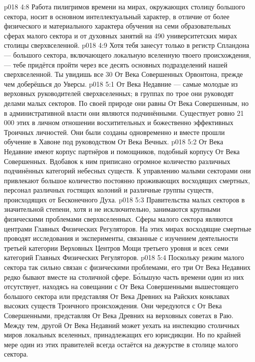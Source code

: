 \vs p018 4:8 Работа пилигримов времени на мирах, окружающих столицу большого сектора, носит в основном интеллектуальный характер, в отличие от более физического и материального характера обучения на семи образовательных сферах малого сектора и от духовных занятий на 490 университетских мирах столицы сверхвселенной.
\vs p018 4:9 Хотя тебя занесут только в регистр Спландона --- большого сектора, включающего локальную вселенную твоего происхождения, --- тебе придётся пройти через все десять основных подразделений нашей сверхвселенной. Ты увидишь все 30 От Века Совершенных Орвонтона, прежде чем доберёшься до Уверсы.
\vs p018 5:1 От Века Недавние --- самые молодые из верховных руководителей сверхвселенных; в группах по трое они руководят делами малых секторов. По своей природе они равны От Века Совершенным, но в административной власти они являются подчинёнными. Существует ровно 21\,000 этих в личном отношении восхитительных и божественно эффективных Троичных личностей. Они были созданы одновременно и вместе прошли обучение в Хавоне под руководством От Века Вечных.
\vs p018 5:2 От Века Недавние имеют корпус партнёров и помощников, подобный корпусу От Века Совершенных. Вдобавок к ним приписано огромное количество различных подчинённых категорий небесных существ. К управлению малыми секторами они привлекают большое количество постоянно проживающих восходящих смертных, персонал различных гостящих колоний и различные группы существ, происходящих от Бесконечного Духа.
\vs p018 5:3 Правительства малых секторов в значительной степени, хотя и не исключительно, занимаются крупными физическими проблемами сверхвселенных. Сферы малого сектора являются центрами Главных Физических Регуляторов. На этих мирах восходящие смертные проводят исследования и эксперименты, связанные с изучением деятельности третьей категории Верховных Центров Мощи третьего уровня и всех семи категорий Главных Физических Регуляторов.
\vs p018 5:4 Поскольку режим малого сектора так сильно связан с физическими проблемами, его три От Века Недавних редко бывают вместе на столичной сфере. Б\'ольшую часть времени один из них отсутствует, находясь на совещании с От Века Совершенными вышестоящего большого сектора или представляя От Века Древних на Райских конклавах высоких существ Троичного происхождения. Они чередуются с От Века Совершенными, представляя От Века Древних на верховных советах в Раю. Между тем, другой От Века Недавний может уехать на инспекцию столичных миров локальных вселенных, принадлежащих его юрисдикции. Но по крайней мере один из этих правителей всегда остаётся на дежурстве в столице малого сектора.
